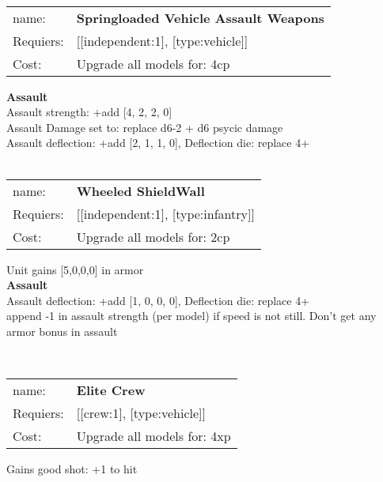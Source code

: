 \ \\
\begin{tabular}{ll}
name: & {\bf Springloaded Vehicle Assault Weapons } \\
Requiers: & [[independent:1], [type:vehicle]] \\
Cost: & Upgrade all models for: 4cp \\
\end{tabular}





{\bf Assault} \ \\
Assault strength: +add [4, 2, 2, 0] 
\\ 
Assault Damage set to: replace d6-2 + d6 psycic damage
\\ 
Assault deflection: +add [2, 1, 1, 0], Deflection die: replace 4+
\\ 




\ \\
\begin{tabular}{ll}
name: & {\bf Wheeled ShieldWall } \\
Requiers: & [[independent:1], [type:infantry]] \\
Cost: & Upgrade all models for: 2cp \\
\end{tabular}

Unit gains [5,0,0,0] in armor\\ 




{\bf Assault} \ \\
Assault deflection: +add [1, 0, 0, 0], Deflection die: replace 4+
\\ 

append -1 in assault strength (per model) if speed is not still. Don't get any armor bonus in assault


\ \\
\begin{tabular}{ll}
name: & {\bf Elite Crew } \\
Requiers: & [[crew:1], [type:vehicle]] \\
Cost: & Upgrade all models for: 4xp \\
\end{tabular}

Gains good shot: +1 to hit\\ 









